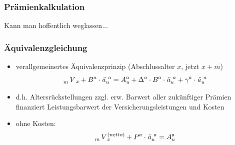 \documentclass[12pt]{report}
\theoremstyle{dotless}
\theoremstyle{definition}
\begin{document}
\subsubsection{Prämienkalkulation}
Kann man hoffentlich weglassen...

\subsubsection{Äquivalenzgleichung}
\begin{itemize}
	\item verallgemeinertes Äquivalenzprinzip (Abschlussalter $x$, jetzt $x+m$)
		\begin{equation}
			\tensor[_m]{V}{}_x + B^a \cdot \text{\textit{ä}}^{\ a}_u = A_u^a + \Delta^a \cdot B^a \cdot \text{\textit{ä}}^{\ a}_u + \gamma^a \cdot \text{\textit{ä}}^{\ a}_u
		\end{equation}
	\item d.h. Altersrückstellungen zzgl. erw. Barwert aller zukünftiger Prämien finanziert Leistungsbarwert der Versicherungsleistungen und Kosten
	\item ohne Kosten: 
		\begin{equation}
			\tensor[_m]{V}{}_x^{(netto)} + P^a \cdot \text{\textit{ä}}^{\ a}_u = A_u^a
		\end{equation}
\end{itemize}
\end{document}
